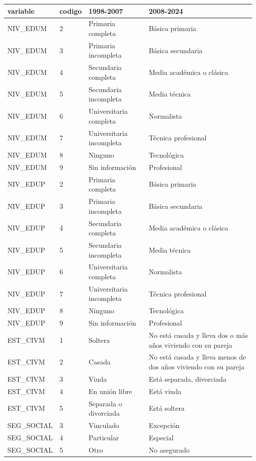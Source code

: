 \begin{tabular}{llll}
\toprule
variable & codigo & 1998-2007 & 2008-2024 \\
\midrule
NIV\_EDUM & 2 & Primaria completa & Básica primaria \\
NIV\_EDUM & 3 & Primaria incompleta & Básica secundaria \\
NIV\_EDUM & 4 & Secundaria completa & Media académica o clásica \\
NIV\_EDUM & 5 & Secundaria incompleta & Media técnica \\
NIV\_EDUM & 6 & Universitaria completa & Normalista \\
NIV\_EDUM & 7 & Universitaria incompleta & Técnica profesional \\
NIV\_EDUM & 8 & Ninguno & Tecnológica \\
NIV\_EDUM & 9 & Sin información & Profesional \\
NIV\_EDUP & 2 & Primaria completa & Básica primaria \\
NIV\_EDUP & 3 & Primaria incompleta & Básica secundaria \\
NIV\_EDUP & 4 & Secundaria completa & Media académica o clásica \\
NIV\_EDUP & 5 & Secundaria incompleta & Media técnica \\
NIV\_EDUP & 6 & Universitaria completa & Normalista \\
NIV\_EDUP & 7 & Universitaria incompleta & Técnica profesional \\
NIV\_EDUP & 8 & Ninguno & Tecnológica \\
NIV\_EDUP & 9 & Sin información & Profesional \\
EST\_CIVM & 1 & Soltera & No está casada y lleva dos o más años viviendo con su pareja \\
EST\_CIVM & 2 & Casada & No está casada y lleva menos de dos años viviendo con su pareja \\
EST\_CIVM & 3 & Viuda & Está separada, divorciada \\
EST\_CIVM & 4 & En unión libre & Está viuda \\
EST\_CIVM & 5 & Separada o divorciada & Está soltera \\
SEG\_SOCIAL & 3 & Vinculado & Excepción \\
SEG\_SOCIAL & 4 & Particular & Especial \\
SEG\_SOCIAL & 5 & Otro & No asegurado \\
\bottomrule
\end{tabular}
